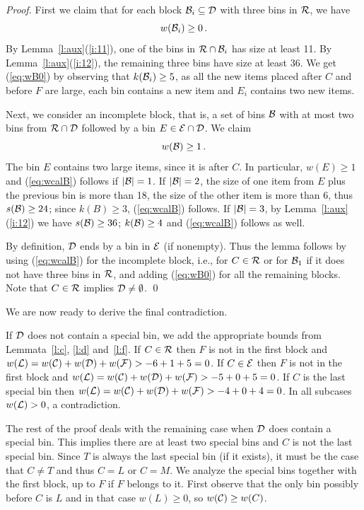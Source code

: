 \begin{proof}
First we claim that for each block ${\mathcal B}_i\subseteq{\mathcal D}$ with three
bins in ${\mathcal R}$, we have 
\begin{equation}
\label{eq:wB0}
w({\mathcal B}_i)\geq 0\,.
\end{equation} 
By Lemma~\ref{l:aux}(\ref{i:11}), one of the bins in ${\mathcal R}\cap{\mathcal B}_i$
has size at least 11. By Lemma~\ref{l:aux}(\ref{i:12}), the remaining
three bins have size at least 36. We get (\ref{eq:wB0}) by observing that
$k({\mathcal B}_i)\geq 5$, as all the new items placed after $C$ and
before $F$ are large, each bin
contains a new item and $E_i$ contains two new items.

Next, we consider an incomplete block, that is,
a set of bins ${\mathcal B}$ with at most two bins
from ${\mathcal R}\cap{\mathcal D}$ followed by a bin $E\in{\mathcal E}\cap{\mathcal D}$.
We claim 
\begin{equation}
\label{eq:wcalB}
w({\mathcal B})\geq 1\,. 
\end{equation}
The bin $E$ contains two large items, since it is after $C$. In particular,
$w(E)\geq 1$ and (\ref{eq:wcalB}) follows if $|{\mathcal B}|=1$. If $|{\mathcal B}|=2$, the
size of one item from $E$ plus the previous bin is more than 18, the
size of the other item is more than 6, thus $s({\mathcal B})\geq 24$; since
$k(B)\geq 3$, (\ref{eq:wcalB}) follows.  If $|{\mathcal B}|=3$, by
Lemma~\ref{l:aux}(\ref{i:12}) we have $s({\mathcal B})\geq 36$; $k({\mathcal B})\geq
4$ and (\ref{eq:wcalB}) follows as well.

By definition, ${\mathcal D}$ ends by a bin in ${\mathcal E}$ (if nonempty). Thus
the lemma follows by using (\ref{eq:wcalB}) for the incomplete block,
i.e., for $C\in{\mathcal R}$ or for ${\mathcal B}_1$ if it does not have three bins
in ${\mathcal R}$, and adding (\ref{eq:wB0}) for all the remaining blocks.
Note that $C\in{\mathcal R}$ implies ${\mathcal D}\not=\emptyset$.
\qed
\end{proof}

We are now ready to derive the final contradiction. 

If ${\mathcal D}$ does not contain a special bin, we add the
appropriate bounds from Lemmata~\ref{l:c}, \ref{l:d} and~\ref{l:f}.
If $C\in{\mathcal R}$ then $F$ is not in the first block and
$w({\mathcal L})=w({\mathcal C})+w({\mathcal D})+w({\mathcal F})>-6+1+5=0$.  If $C\in{\mathcal E}$ then
$F$ is not in the first block and
$w({\mathcal L})=w({\mathcal C})+w({\mathcal D})+w({\mathcal F})>-5+0+5=0$.  If $C$ is the last
special bin then $w({\mathcal L})=w({\mathcal C})+w({\mathcal D})+w({\mathcal F})>-4+0+4=0$. In
all subcases $w({\mathcal L})>0$, a contradiction.

The rest of the proof deals with the remaining case when ${\mathcal D}$ does
contain a special bin. This implies there are at least two special
bins and $C$ is not the last special bin. Since $T$ is always the last
special bin (if it exists), it must be the case that $C\neq T$ and
thus $C=L$ or $C=M$.  We analyze the special bins together with the
first block, up to $F$ if $F$ belongs to it.  First observe that the
only bin possibly before $C$ is $L$ and in that case $w(L)\ge0$, so
$w({\mathcal C})\geq w(C)$.

